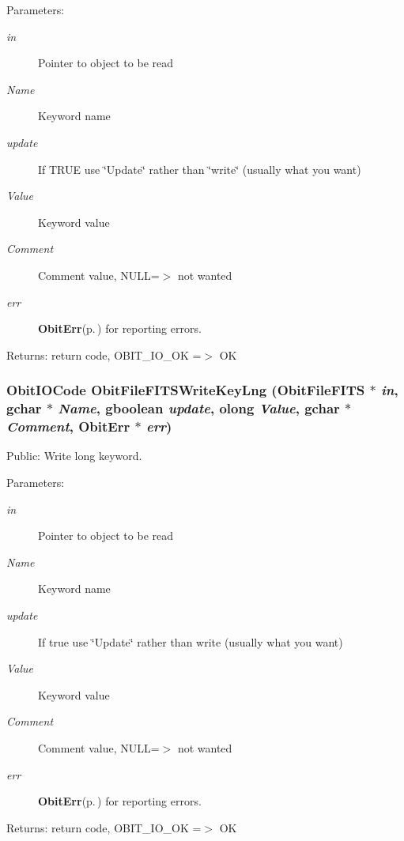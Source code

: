 \begin{Desc}
\item[Parameters:]
\begin{description}
\item[{\em in}]Pointer to object to be read \item[{\em Name}]Keyword name \item[{\em update}]If TRUE use \char`\"{}Update\char`\"{} rather than \char`\"{}write\char`\"{} (usually what you want) \item[{\em Value}]Keyword value \item[{\em Comment}]Comment value, NULL=$>$ not wanted \item[{\em err}]{\bf Obit\-Err}{\rm (p.\,\pageref{structObitErr})} for reporting errors. \end{description}
\end{Desc}
\begin{Desc}
\item[Returns:]return code, OBIT\_\-IO\_\-OK =$>$ OK \end{Desc}
\subsubsection{\setlength{\rightskip}{0pt plus 5cm}Obit\-IOCode Obit\-File\-FITSWrite\-Key\-Lng ({\bf Obit\-File\-FITS} $\ast$ {\em in}, gchar $\ast$ {\em Name}, gboolean {\em update}, {\bf olong} {\em Value}, gchar $\ast$ {\em Comment}, {\bf Obit\-Err} $\ast$ {\em err})}\label{ObitFileFITS_8h_a22}


Public: Write long keyword. 

\begin{Desc}
\item[Parameters:]
\begin{description}
\item[{\em in}]Pointer to object to be read \item[{\em Name}]Keyword name \item[{\em update}]If true use \char`\"{}Update\char`\"{} rather than write (usually what you want) \item[{\em Value}]Keyword value \item[{\em Comment}]Comment value, NULL=$>$ not wanted \item[{\em err}]{\bf Obit\-Err}{\rm (p.\,\pageref{structObitErr})} for reporting errors. \end{description}
\end{Desc}
\begin{Desc}
\item[Returns:]return code, OBIT\_\-IO\_\-OK =$>$ OK \end{Desc}
